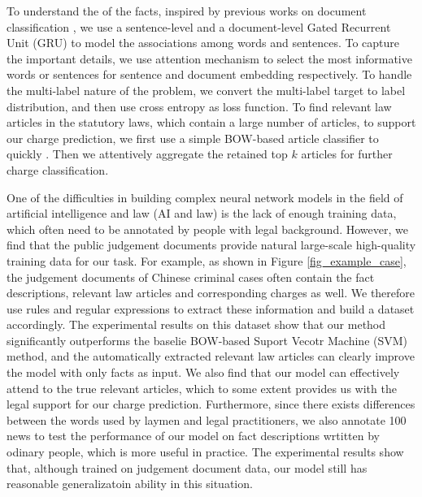 To understand the  of the facts, inspired by previous works on document classification \cite{tang2015document,yang2016hierarchical}, we use a sentence-level and a document-level Gated Recurrent Unit (GRU) to model the associations among words and sentences.
To capture the important details, we use attention mechanism to select the most informative words or sentences for sentence and document embedding respectively. 
To handle the multi-label nature of the problem, we convert the multi-label target to label distribution, and then use cross entropy as loss function. 
To find relevant law articles in the statutory laws, which contain a large number of articles, to support our charge prediction, we first use a simple BOW-based article classifier to quickly . Then we attentively aggregate the retained top $k$ articles for further charge classification.

One of the difficulties in building complex neural network models in the field of artificial intelligence and law (AI and law) is the lack of enough training data, which often need to be annotated by people with legal background. However, we find that the public judgement documents provide natural large-scale high-quality training data for our task. For example, as shown in Figure \ref{fig_example_case}, the judgement documents of Chinese criminal cases often contain the fact descriptions, relevant law articles and corresponding charges as well. We therefore use rules and regular expressions to extract these information and build a dataset accordingly. The experimental results on this dataset show that our method significantly outperforms the baselie BOW-based Suport Vecotr Machine (SVM) method, and the automatically extracted relevant law articles can clearly improve the model with only facts as input. We also find that our model can effectively attend to the true relevant articles, which to some extent provides us with the legal support for our charge prediction. Furthermore, since there exists differences between the words used by laymen and legal practitioners, we also annotate 100 news to test the performance of our model on fact descriptions wrtitten by odinary people, which is more useful in practice. The experimental results show that, although trained on judgement document data, our model still has reasonable generalizatoin ability in this situation.


